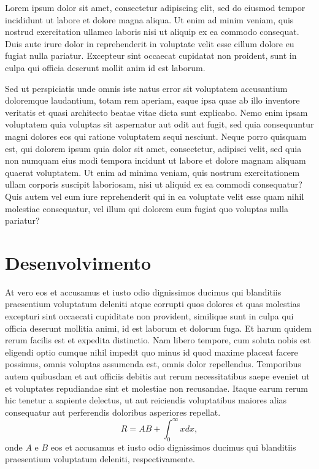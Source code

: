 \documentclass[a0,portrait]{a0poster}
\begin{document}
\begin{mdframed}[style=MyFrame]
\begin{multicols}{2}
Lorem ipsum dolor sit amet, consectetur adipiscing elit, sed do eiusmod tempor incididunt ut labore et dolore magna aliqua. Ut enim ad minim veniam, quis nostrud exercitation ullamco laboris nisi ut aliquip ex ea commodo consequat. Duis aute irure dolor in reprehenderit in voluptate velit esse cillum dolore eu fugiat nulla pariatur. Excepteur sint occaecat cupidatat non proident, sunt in culpa qui officia deserunt mollit anim id est laborum.

Sed ut perspiciatis unde omnis iste natus error sit voluptatem accusantium doloremque laudantium, totam rem aperiam, eaque ipsa quae ab illo inventore veritatis et quasi architecto beatae vitae dicta sunt explicabo. Nemo enim ipsam voluptatem quia voluptas sit aspernatur aut odit aut fugit, sed quia consequuntur magni dolores eos qui ratione voluptatem sequi nesciunt. Neque porro quisquam est, qui dolorem ipsum quia dolor sit amet, consectetur, adipisci velit, sed quia non numquam eius modi tempora incidunt ut labore et dolore magnam aliquam quaerat voluptatem. Ut enim ad minima veniam, quis nostrum exercitationem ullam corporis suscipit laboriosam, nisi ut aliquid ex ea commodi consequatur? Quis autem vel eum iure reprehenderit qui in ea voluptate velit esse quam nihil molestiae consequatur, vel illum qui dolorem eum fugiat quo voluptas nulla pariatur?


%



\section{Desenvolvimento}\label{section2}
%
At vero eos et accusamus et iusto odio dignissimos ducimus qui blanditiis praesentium voluptatum deleniti atque corrupti quos dolores et quas molestias excepturi sint occaecati cupiditate non provident, similique sunt in culpa qui officia deserunt mollitia animi, id est laborum et dolorum fuga. Et harum quidem rerum facilis est et expedita distinctio. Nam libero tempore, cum soluta nobis est eligendi optio cumque nihil impedit quo minus id quod maxime placeat facere possimus, omnis voluptas assumenda est, omnis dolor repellendus. Temporibus autem quibusdam et aut officiis debitis aut rerum necessitatibus saepe eveniet ut et voluptates repudiandae sint et molestiae non recusandae. Itaque earum rerum hic tenetur a sapiente delectus, ut aut reiciendis voluptatibus maiores alias consequatur aut perferendis doloribus asperiores repellat.
%
\begin{equation}
    R = A B + \int_0^\infty x dx,
\end{equation}
%
onde $A$ e $B$ eos et accusamus et iusto odio dignissimos ducimus qui blanditiis praesentium voluptatum deleniti, respectivamente.


\end{multicols}
\end{mdframed}
\end{document}
